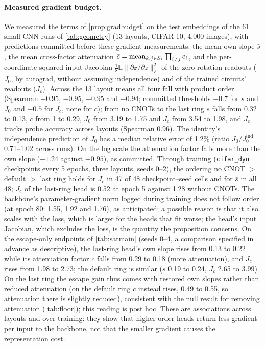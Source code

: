 \paragraph{Measured gradient budget.} We measured the terms of \cref{prop:gradbudget} on the test embeddings of the 61 small-CNN
runs of \cref{tab:geometry} (13 layouts, CIFAR-10, 4,000 images), with predictions committed before these gradient measurements: the mean own
slope $\bar s$, the mean cross-factor attenuation $\bar c=\mathrm{mean}_{k,j\in S_k}\prod_{i\ne j}c_i$, and the per-coordinate squared
input Jacobian $\frac18\mathbb{E}\|\partial\mathbf r/\partial z\|_F^2$ of the zero-rotation readouts ($J_0$, by autograd, without assuming
independence) and of the trained circuits' readouts ($J_c$). Across the 13 layout means all four fall with product order
(Spearman $-0.95$, $-0.95$, $-0.95$ and $-0.94$; committed thresholds $-0.7$ for $\bar s$ and $J_0$ and $-0.5$ for $J_c$, none for $\bar c$); from no CNOTs to the last ring
$\bar s$ falls from 0.32 to 0.13, $\bar c$ from 1 to 0.29, $J_0$ from 3.19 to 1.75 and $J_c$ from 3.54 to 1.98, and $J_c$ tracks probe
accuracy across layouts (Spearman $0.96$). The identity's independence prediction of $J_0$ has a median relative error of 1.2\% (ratio $J_0/J_0^{\mathrm{ind}}$ 0.71--1.02 across runs). On the log scale the attenuation factor falls more than the own slope ($-1.24$ against $-0.95$), as committed. Through training
(\texttt{cifar\_dyn} checkpoints every 5 epochs, three layouts, seeds 0--2), the ordering no CNOT $>$ default $>$ last ring holds for
$J_c$ in 47 of 48 checkpoint--seed cells and for $\bar s$ in all 48; $J_c$ of the last-ring head is 0.52 at epoch 5 against 1.28 without
CNOTs. The backbone's parameter-gradient norm logged during training does not follow order (at epoch 80: 1.55, 1.92 and 1.76), as
anticipated; a possible reason is that it also scales with the loss, which is larger for the heads that fit worse; the head's input Jacobian, which
excludes the loss, is the quantity the proposition concerns. On the escape-only endpoints of \cref{tab:satmain} (seeds 0--4,
a comparison specified in advance as descriptive), the last-ring head's own slope rises from 0.13 to 0.22 while its attenuation factor $\bar c$ falls from 0.29 to 0.18 (more attenuation), and $J_c$
rises from 1.98 to 2.73; the default ring is similar ($\bar s$ 0.19 to 0.24, $J_c$ 2.65 to 3.99). On the last ring the escape gain thus comes with restored
own slopes rather than reduced attenuation (on the default ring $\bar c$ instead rises, 0.49 to 0.55, so attenuation there is slightly reduced), consistent with the null result for removing attenuation (\cref{tab:floor}); this reading
is post hoc. These are associations across layouts and over training: they show that higher-order heads return less gradient per
input to the backbone, not that the smaller gradient causes the representation cost.


